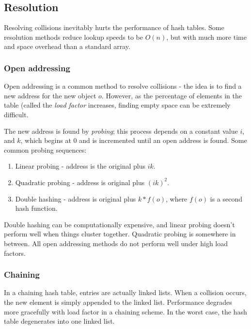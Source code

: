\documentclass{article}
\begin{document}
\subsection{Resolution}

Resolving collisions inevitably hurts the performance of hash tables.  Some resolution methods reduce lookup speeds to be $O(n)$, but with much more time and space overhead than a standard array.

\subsubsection{Open addressing}
Open addressing is a common method to resolve collisions - the idea is to find a new address for the new object $o$.  However, as the percentage of elements in the table (called the \textit{load factor} increases, finding empty space can be extremely difficult.

The new address is found by \textit{probing}; this process depends on a constant value $i$, and $k$, which begins at 0 and is incremented until an open address is found.  Some common probing sequences:
\begin{enumerate}
\item Linear probing - address is the original plus $ik$.
\item Quadratic probing - address is original plus $(ik)^2$. 
\item Double hashing - address is original plus $k*f(o)$, where $f(o)$ is a second hash function.
\end{enumerate}

Double hashing can be computationally expensive, and linear probing doesn't perform well when things cluster together.  Quadratic probing is somewhere in between.  All open addressing methods do not perform well under high load factors.

\subsubsection{Chaining}
In a chaining hash table, entries are actually linked lists.  When a collision occurs, the new element is simply appended to the linked list.  Performance degrades more gracefully with load factor in a chaining scheme.  
In the worst case, the hash table degenerates into one linked list.
\end{document}
